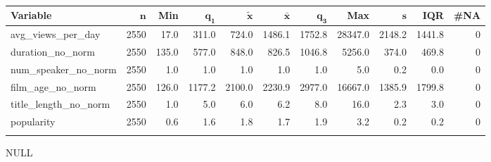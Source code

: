 \begingroup\footnotesize
\begin{longtable}{lrrrrrrrrrr}
 \textbf{Variable} & $\mathbf{n}$ & \textbf{Min} & $\mathbf{q_1}$ & $\mathbf{\widetilde{x}}$ & $\mathbf{\bar{x}}$ & $\mathbf{q_3}$ & \textbf{Max} & $\mathbf{s}$ & \textbf{IQR} & \textbf{\#NA} \\ 
  \hline
avg\_views\_per\_day & 2550 &  17.0 &  311.0 &  724.0 & 1486.1 & 1752.8 & 28347.0 & 2148.2 & 1441.8 & 0 \\ 
  duration\_no\_norm & 2550 & 135.0 &  577.0 &  848.0 &  826.5 & 1046.8 &  5256.0 &  374.0 &  469.8 & 0 \\ 
  num\_speaker\_no\_norm & 2550 &   1.0 &    1.0 &    1.0 &    1.0 &    1.0 &     5.0 &    0.2 &    0.0 & 0 \\ 
  film\_age\_no\_norm & 2550 & 126.0 & 1177.2 & 2100.0 & 2230.9 & 2977.0 & 16667.0 & 1385.9 & 1799.8 & 0 \\ 
  title\_length\_no\_norm & 2550 &   1.0 &    5.0 &    6.0 &    6.2 &    8.0 &    16.0 &    2.3 &    3.0 & 0 \\ 
  popularity & 2550 &   0.6 &    1.6 &    1.8 &    1.7 &    1.9 &     3.2 &    0.2 &    0.2 & 0 \\ 
  \hline
\caption{} 
\label{}
\end{longtable}
\endgroup
NULL
